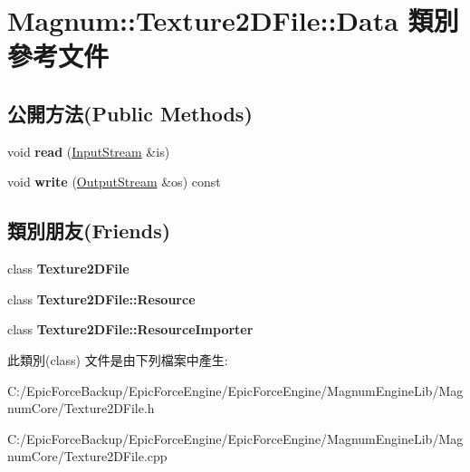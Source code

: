 \hypertarget{class_magnum_1_1_texture2_d_file_1_1_data}{}\section{Magnum\+:\+:Texture2\+D\+File\+:\+:Data 類別 參考文件}
\label{class_magnum_1_1_texture2_d_file_1_1_data}
\subsection*{公開方法(Public Methods)}
\begin{DoxyCompactItemize}
\item 
void {\bfseries read} (\hyperlink{class_magnum_1_1_input_stream}{Input\+Stream} \&is)\hypertarget{class_magnum_1_1_texture2_d_file_1_1_data_a5c4ee0a563f8f83f37de677db17c5d2d}{}\label{class_magnum_1_1_texture2_d_file_1_1_data_a5c4ee0a563f8f83f37de677db17c5d2d}

\item 
void {\bfseries write} (\hyperlink{class_magnum_1_1_output_stream}{Output\+Stream} \&os) const \hypertarget{class_magnum_1_1_texture2_d_file_1_1_data_abd0731caf048b9dbe2cb7a5d3308c685}{}\label{class_magnum_1_1_texture2_d_file_1_1_data_abd0731caf048b9dbe2cb7a5d3308c685}

\end{DoxyCompactItemize}
\subsection*{類別朋友(Friends)}
\begin{DoxyCompactItemize}
\item 
class {\bfseries Texture2\+D\+File}\hypertarget{class_magnum_1_1_texture2_d_file_1_1_data_a78135ffc60f8c1be32a0f49fc97f9426}{}\label{class_magnum_1_1_texture2_d_file_1_1_data_a78135ffc60f8c1be32a0f49fc97f9426}

\item 
class {\bfseries Texture2\+D\+File\+::\+Resource}\hypertarget{class_magnum_1_1_texture2_d_file_1_1_data_aa240389cb83e3e814688791009b71c2c}{}\label{class_magnum_1_1_texture2_d_file_1_1_data_aa240389cb83e3e814688791009b71c2c}

\item 
class {\bfseries Texture2\+D\+File\+::\+Resource\+Importer}\hypertarget{class_magnum_1_1_texture2_d_file_1_1_data_addc15ea48fadfdc9672288b3cb2270b9}{}\label{class_magnum_1_1_texture2_d_file_1_1_data_addc15ea48fadfdc9672288b3cb2270b9}

\end{DoxyCompactItemize}


此類別(class) 文件是由下列檔案中產生\+:\begin{DoxyCompactItemize}
\item 
C\+:/\+Epic\+Force\+Backup/\+Epic\+Force\+Engine/\+Epic\+Force\+Engine/\+Magnum\+Engine\+Lib/\+Magnum\+Core/Texture2\+D\+File.\+h\item 
C\+:/\+Epic\+Force\+Backup/\+Epic\+Force\+Engine/\+Epic\+Force\+Engine/\+Magnum\+Engine\+Lib/\+Magnum\+Core/Texture2\+D\+File.\+cpp\end{DoxyCompactItemize}
